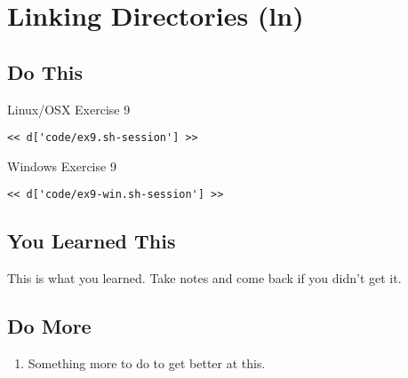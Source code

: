 \chapter{Linking Directories (ln)}

\section{Do This}

\begin{code}{Linux/OSX Exercise 9}
\begin{Verbatim}
<< d['code/ex9.sh-session'] >>
\end{Verbatim}
\end{code}

\begin{code}{Windows Exercise 9}
\begin{Verbatim}
<< d['code/ex9-win.sh-session'] >>
\end{Verbatim}
\end{code}

\section{You Learned This}

This is what you learned.  Take notes and come back if you didn't get it.

\section{Do More}

\begin{enumerate}
\item Something more to do to get better at this.
\end{enumerate}

